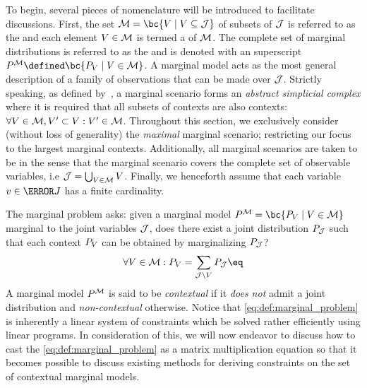 \documentclass[aps, 10pt, english, twoside, pra, nofootinbib, tightenlines, longbibliography, superscriptaddress]{revtex4-1}
\begin{document}
    To begin, several pieces of nomenclature will be introduced to facilitate discussions. First, the set $\mscenario = \bc{V \mid V \subseteq \jointvar}$ of subsets of $\mathcal{J}$ is referred to as the  and each element $V \in \mathcal{M}$ is termed a  of $\mathcal{M}$. The complete set of marginal distributions is referred to as the  and is denoted with an superscript $\prob^{\mscenario} \defined \bc{\prob[V] \mid V \in \mscenario}$. A marginal model acts as the most general description of a family of observations that can be made over $\mathcal{J}$. Strictly speaking, as defined by~\cite{Fritz_2011}, a marginal scenario forms an \textit{abstract simplicial complex} where it is required that all subsets of contexts are also contexts: $\forall V \in \mathcal{M}, V' \subset V : V' \in \mathcal{M}$. Throughout this section, we exclusively consider (without loss of generality) the \textit{maximal} marginal scenario; restricting our focus to the largest marginal contexts. Additionally, all marginal scenarios are taken to be  in the sense that the marginal scenario covers the complete set of observable variables, i.e $\mathcal{J} = \bigcup_{V \in \mathcal{M}} V$. Finally, we henceforth assume that each variable $v \in \s J$ has a finite cardinality.

    The marginal problem asks: given a marginal model $\prob^{\mscenario} = \bc{\prob[V] \mid V \in \mscenario}$ marginal to the joint variables $\mathcal{J}$, does there exist a joint distribution $\prob[\jointvar]$ such that each context $\prob[V]$ can be obtained by marginalizing $\prob[\jointvar]$?
    \[ \forall V \in \mscenario : \prob[V] = \sum_{\jointvar \setminus V} \prob[\jointvar] \eq \label{eq:def:marginal_problem}\]
    A marginal model $\prob^{\mscenario}$ is said to be \textit{contextual} if it \textit{does not} admit a joint distribution and \textit{non-contextual} otherwise. Notice that \cref{eq:def:marginal_problem} is inherently a linear system of constraints which be solved rather efficiently using linear programs. In consideration of this, we will now endeavor to discuss how to cast the \cref{eq:def:marginal_problem} as a matrix multiplication equation so that it becomes possible to discuss existing methods for deriving constraints on the set of contextual marginal models.
\end{document}
